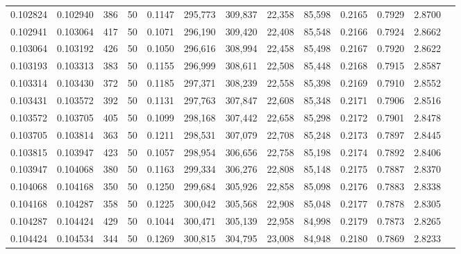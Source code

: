 \begin{tabular}{rrrrrrrrrrrrr}
0.102824 & 0.102940 &   386 &  50 &                                     0.1147 & 295,773 & 309,837 &  22,358 &  85,598 & 0.2165 & 0.7929 & 2.8700 \\
0.102941 & 0.103064 &   417 &  50 &                                     0.1071 & 296,190 & 309,420 &  22,408 &  85,548 & 0.2166 & 0.7924 & 2.8662 \\
0.103064 & 0.103192 &   426 &  50 &                                     0.1050 & 296,616 & 308,994 &  22,458 &  85,498 & 0.2167 & 0.7920 & 2.8622 \\
0.103193 & 0.103313 &   383 &  50 &                                     0.1155 & 296,999 & 308,611 &  22,508 &  85,448 & 0.2168 & 0.7915 & 2.8587 \\
0.103314 & 0.103430 &   372 &  50 &                                     0.1185 & 297,371 & 308,239 &  22,558 &  85,398 & 0.2169 & 0.7910 & 2.8552 \\
0.103431 & 0.103572 &   392 &  50 &                                     0.1131 & 297,763 & 307,847 &  22,608 &  85,348 & 0.2171 & 0.7906 & 2.8516 \\
0.103572 & 0.103705 &   405 &  50 &                                     0.1099 & 298,168 & 307,442 &  22,658 &  85,298 & 0.2172 & 0.7901 & 2.8478 \\
0.103705 & 0.103814 &   363 &  50 &                                     0.1211 & 298,531 & 307,079 &  22,708 &  85,248 & 0.2173 & 0.7897 & 2.8445 \\
0.103815 & 0.103947 &   423 &  50 &                                     0.1057 & 298,954 & 306,656 &  22,758 &  85,198 & 0.2174 & 0.7892 & 2.8406 \\
0.103947 & 0.104068 &   380 &  50 &                                     0.1163 & 299,334 & 306,276 &  22,808 &  85,148 & 0.2175 & 0.7887 & 2.8370 \\
0.104068 & 0.104168 &   350 &  50 &                                     0.1250 & 299,684 & 305,926 &  22,858 &  85,098 & 0.2176 & 0.7883 & 2.8338 \\
0.104168 & 0.104287 &   358 &  50 &                                     0.1225 & 300,042 & 305,568 &  22,908 &  85,048 & 0.2177 & 0.7878 & 2.8305 \\
0.104287 & 0.104424 &   429 &  50 &                                     0.1044 & 300,471 & 305,139 &  22,958 &  84,998 & 0.2179 & 0.7873 & 2.8265 \\
0.104424 & 0.104534 &   344 &  50 &                                     0.1269 & 300,815 & 304,795 &  23,008 &  84,948 & 0.2180 & 0.7869 & 2.8233 \\

\end{tabular}
